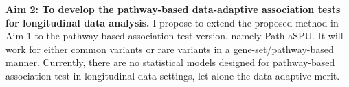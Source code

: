 \documentclass[12pt]{article}
\begin{document}
\textbf{Aim 2: To develop the pathway-based data-adaptive association tests for longitudinal data analysis.}
I propose to extend the proposed method in Aim 1 to the pathway-based association test version, namely Path-aSPU. It will work for either common variants or rare variants in a gene-set/pathway-based manner. Currently, there are no statistical models designed for pathway-based association test in longitudinal data settings, let alone the data-adaptive merit.

\end{document}
